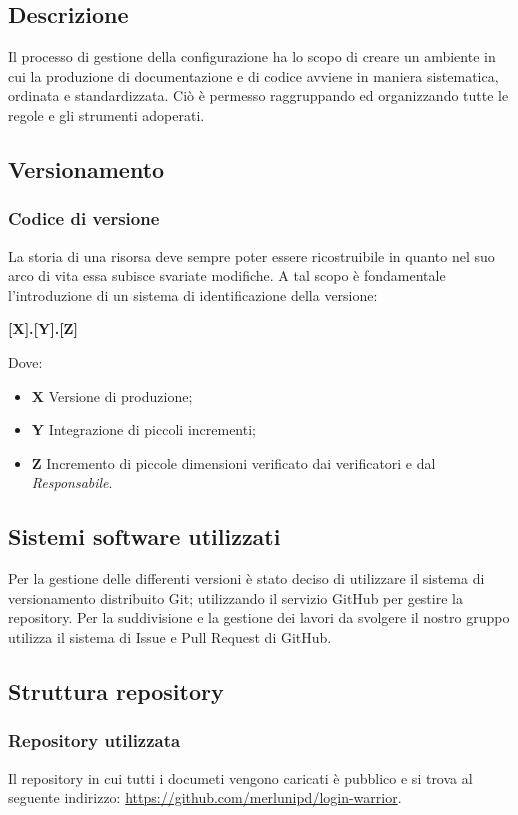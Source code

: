  \subsection{Descrizione}
    Il processo di gestione della configurazione ha lo scopo di creare un ambiente in cui la produzione di
    documentazione e di codice avviene in maniera sistematica, ordinata e standardizzata. Ciò è permesso
    raggruppando ed organizzando tutte le regole e gli strumenti adoperati.
 \subsection{Versionamento}
   \subsubsection{Codice di versione}
   La storia di una risorsa deve sempre poter essere ricostruibile in quanto nel suo arco di vita essa subisce
   svariate modifiche. A tal scopo è fondamentale l'introduzione di un sistema di identificazione della
   versione:
   \begin{center}
       \textbf{[X].[Y].[Z]}
   \end{center}
   Dove:
   \begin{itemize}
       \item \textbf{X} Versione di produzione;
       \item \textbf{Y} Integrazione di piccoli incrementi;
       \item \textbf{Z} Incremento di piccole dimensioni verificato dai verificatori e dal \textit{Responsabile}.
   \end{itemize}


 \subsection{Sistemi software utilizzati}
 Per la gestione delle differenti versioni è stato deciso di utilizzare il sistema di versionamento distribuito Git; utilizzando il servizio GitHub per gestire la repository.
 Per la suddivisione e la gestione dei lavori da svolgere il nostro gruppo utilizza il sistema di Issue e Pull Request di GitHub.

 \subsection{Struttura repository}
  \subsubsection{Repository utilizzata}
  Il repository in cui tutti i documeti vengono caricati è pubblico e si trova al seguente indirizzo:
  \url{https://github.com/merlunipd/login-warrior}.

